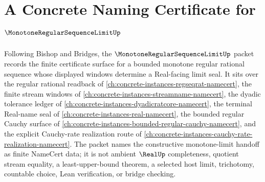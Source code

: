 \chapter{A Concrete Naming Certificate for $\MonotoneRegularSequenceLimitUp$}
\label{ch:concrete-instances-monotone-regular-sequence-limit-namecert}

Following Bishop and Bridges, the $\MonotoneRegularSequenceLimitUp$ packet records the finite certificate surface for a bounded monotone regular rational sequence whose displayed windows determine a Real-facing limit seal. It sits over the regular rational readback of \autoref{ch:concrete-instances-regseqrat-namecert}, the finite stream windows of \autoref{ch:concrete-instances-streamname-namecert}, the dyadic tolerance ledger of \autoref{ch:concrete-instances-dyadicratcore-namecert}, the terminal Real-name seal of \autoref{ch:concrete-instances-real-namecert}, the bounded regular Cauchy surface of \autoref{ch:concrete-instances-bounded-regular-cauchy-namecert}, and the explicit Cauchy-rate realization route of \autoref{ch:concrete-instances-cauchy-rate-realization-namecert}. The packet names the constructive monotone-limit handoff as finite NameCert data; it is not ambient $\RealUp$ completeness, quotient stream equality, a least-upper-bound theorem, a selected host limit, trichotomy, countable choice, Lean verification, or bridge checking.

